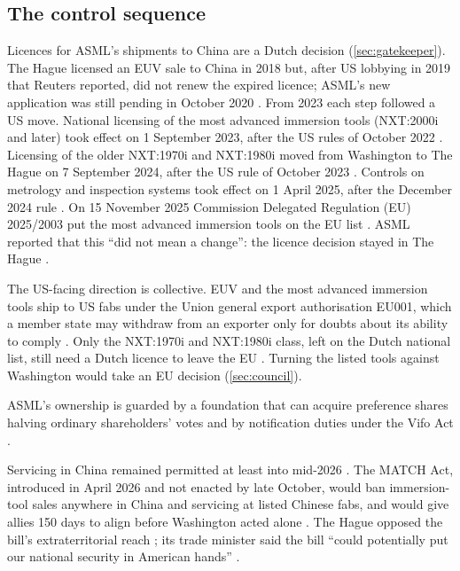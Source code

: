 \subsection{The control sequence}

Licences for ASML's shipments to China are a Dutch decision (\cref{sec:gatekeeper}). The Hague licensed an EUV sale to China in 2018 but, after US lobbying in 2019 that Reuters reported, did not renew the expired licence; ASML's new application was still pending in October 2020 \citep{nltimes2020pressured, kaag2020asml}. From 2023 each step followed a US move. National licensing of the most advanced immersion tools (NXT:2000i and later) took effect on 1 September 2023, after the US rules of October 2022 \citep{govnl2023controls}. Licensing of the older NXT:1970i and NXT:1980i moved from Washington to The Hague on 7 September 2024, after the US rule of October 2023 \citep{stcrt2024duv, asml2024license}. Controls on metrology and inspection systems took effect on 1 April 2025, after the December 2024 rule \citep{stcrt2025metrology}. On 15 November 2025 Commission Delegated Regulation (EU) 2025/2003 put the most advanced immersion tools on the EU list \citep{eu2025dualuse}. ASML reported that this ``did not mean a change'': the licence decision stayed in The Hague \citep{asml2026annual}.

The US-facing direction is collective. EUV and the most advanced immersion tools ship to US fabs under the Union general export authorisation EU001, which a member state may withdraw from an exporter only for doubts about its ability to comply \citep{eu2021dualuse}. Only the NXT:1970i and NXT:1980i class, left on the Dutch national list, still need a Dutch licence to leave the EU \citep{stcrt2025_38653}. Turning the listed tools against Washington would take an EU decision (\cref{sec:council}).

ASML's ownership is guarded by a foundation that can acquire preference shares halving ordinary shareholders' votes \citep{asml2026annual} and by notification duties under the Vifo Act \citep{nl2022vifo, nl2023sensitief}.

Servicing in China remained permitted at least into mid-2026 \citep{zakaria2026match}. The MATCH Act, introduced in April 2026 and not enacted by late October, would ban immersion-tool sales anywhere in China and servicing at listed Chinese fabs, and would give allies 150 days to align before Washington acted alone \citep{baumgartner2026match, hr8170}. The Hague opposed the bill's extraterritorial reach \citep{tk2026match}; its trade minister said the bill ``could potentially put our national security in American hands'' \citep{nltimes2026irritated}.

